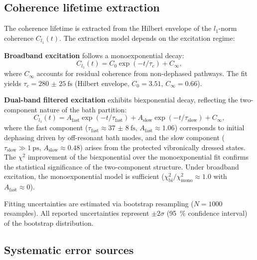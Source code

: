 \documentclass[11pt,a4paper]{article}
\begin{document}
\subsection{Coherence lifetime extraction}

The coherence lifetime is extracted from the Hilbert envelope of the $l_1$-norm coherence $C_{l_1}(t)$. The extraction model depends on the excitation regime:

\noindent\textbf{Broadband excitation} follows a monoexponential decay:
\begin{equation}
C_{l_1}(t) = C_0 \exp(-t/\tau_c) + C_{\infty},
\label{eq:coherence_fit_mono}
\end{equation}
where $C_{\infty}$ accounts for residual coherence from non-dephased pathways. The fit yields $\tau_c = \SI{280(25)}{\femto\second}$ (Hilbert envelope, $C_0 = 3.51$, $C_{\infty} = 0.66$).

\noindent\textbf{Dual-band filtered excitation} exhibits biexponential decay, reflecting the two-component nature of the bath partition:
\begin{equation}
C_{l_1}(t) = A_{\mathrm{fast}} \exp(-t/\tau_{\mathrm{fast}}) + A_{\mathrm{slow}} \exp(-t/\tau_{\mathrm{slow}}) + C_{\infty},
\label{eq:coherence_fit_bi}
\end{equation}
where the fast component ($\tau_{\mathrm{fast}} \approx \SI{37(8)}{\femto\second}$, $A_{\mathrm{fast}} \approx 1.06$) corresponds to initial dephasing driven by off-resonant bath modes, and the slow component ($\tau_{\mathrm{slow}} \gg \SI{1}{\pico\second}$, $A_{\mathrm{slow}} \approx 0.48$) arises from the protected vibronically dressed states. The $\chi^2$ improvement of the biexponential over the monoexponential fit confirms the statistical significance of the two-component structure. Under broadband excitation, the monoexponential model is sufficient ($\chi^2_{\mathrm{bi}}/\chi^2_{\mathrm{mono}} \approx 1.0$ with $A_{\mathrm{fast}} \approx 0$).

Fitting uncertainties are estimated via bootstrap resampling ($N = \num{1000}$ resamples). All reported uncertainties represent $\pm 2\sigma$ (\SI{95}{\percent} confidence interval) of the bootstrap distribution.

\subsection{Systematic error sources}
\end{document}
